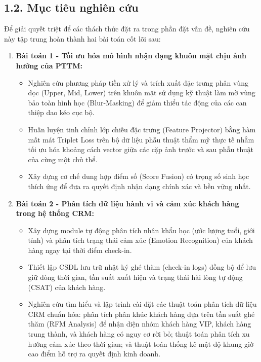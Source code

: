 \subsection*{1.2. Mục tiêu nghiên cứu}

Để giải quyết triệt để các thách thức đặt ra trong phần đặt vấn đề, nghiên cứu này tập trung hoàn thành hai bài toán cốt lõi sau:

\begin{enumerate}
    \item \textbf{Bài toán 1 - Tối ưu hóa mô hình nhận dạng khuôn mặt chịu ảnh hưởng của PTTM:}
    \begin{itemize}
        \item Nghiên cứu phương pháp tiền xử lý và trích xuất đặc trưng phân vùng dọc (Upper, Mid, Lower) trên khuôn mặt sử dụng kỹ thuật làm mờ vùng bảo toàn hình học (Blur-Masking) để giảm thiểu tác động của các can thiệp dao kéo cục bộ.
        \item Huấn luyện tinh chỉnh lớp chiếu đặc trưng (Feature Projector) bằng hàm mất mát Triplet Loss trên bộ dữ liệu phẫu thuật thẩm mỹ thực tế nhằm tối ưu hóa khoảng cách vector giữa các cặp ảnh trước và sau phẫu thuật của cùng một chủ thể.
        \item Xây dựng cơ chế dung hợp điểm số (Score Fusion) có trọng số sinh học thích ứng để đưa ra quyết định nhận dạng chính xác và bền vững nhất.
    \end{itemize}
    
    \item \textbf{Bài toán 2 - Phân tích dữ liệu hành vi và cảm xúc khách hàng trong hệ thống CRM:}
    \begin{itemize}
        \item Xây dựng module tự động phân tích nhân khẩu học (ước lượng tuổi, giới tính) và phân tích trạng thái cảm xúc (Emotion Recognition) của khách hàng ngay tại thời điểm check-in.
        \item Thiết lập CSDL lưu trữ nhật ký ghé thăm (check-in logs) đồng bộ để lưu giữ dòng thời gian, tần suất xuất hiện và trạng thái hài lòng tự động (CSAT) của khách hàng.
        \item Nghiên cứu tìm hiểu và lập trình cài đặt các thuật toán phân tích dữ liệu CRM chuẩn hóa: phân tích phân khúc khách hàng dựa trên tần suất ghé thăm (RFM Analysis) để nhận diện nhóm khách hàng VIP, khách hàng trung thành, và khách hàng có nguy cơ rời bỏ; thuật toán phân tích xu hướng cảm xúc theo thời gian; và thuật toán thống kê mật độ khung giờ cao điểm hỗ trợ ra quyết định kinh doanh.
    \end{itemize}
\end{enumerate}

